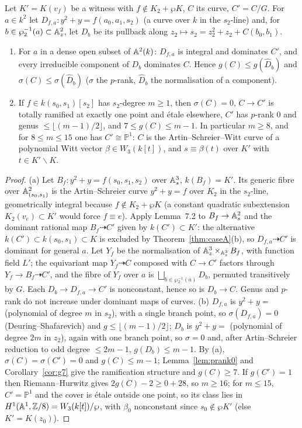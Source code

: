 \begin{theorem}\label{thm:struct}
Let $K'=K(v_f)$ be a witness with $f\notin K_2+\wp K$, $C$ its curve, $C'=C/G$. For
$a\in k^2$ let $D_{f,a}\colon y^2+y=f(a_0,a_1,s_2)$ (a curve over $k$ in the $s_2$-line)
and, for $b\in\wp_2^{-1}(a)\subset\mathbb A^2_z$, let $D_b$ be its pullback along
$z_2\mapsto s_2=z_2^2+z_2+C(b_0,b_1)$.
\begin{enumerate}
\item[(a)] For $a$ in a dense open subset of $\mathbb A^2(k)$: $D_{f,a}$ is integral and
dominates $C'$, and every irreducible component of $D_b$ dominates $C$. Hence
$g(C)\le g(\hat D_b)$ and $\sigma(C)\le\sigma(\hat D_b)$ ($\sigma$ the $p$-rank, $\hat D_b$
the normalisation of a component).
\item[(b)] If $f\in k(s_0,s_1)[s_2]$ has $s_2$-degree $m\ge1$, then $\sigma(C)=0$,
$C\to C'$ is totally ramified at exactly one point and \'etale elsewhere, $C'$ has
$p$-rank $0$ and genus $\le\lfloor(m-1)/2\rfloor$, and $7\le g(C)\le m-1$. In particular
$m\ge8$, and for $8\le m\le15$ one has $C'\cong\mathbb P^1$: $C$ is the
Artin--Schreier--Witt curve of a polynomial Witt vector $\beta\in W_3(k[t])$, and
$s\equiv\beta(t)$ over $K'$ with $t\in K'\smallsetminus K$.
\end{enumerate}
\end{theorem}

\begin{proof}
(a) Let $B_f\colon y^2+y=f(s_0,s_1,s_2)$ over $\mathbb A^3_s$, $k(B_f)=K'$. Its generic fibre
over $\mathbb A^2_{(s_0,s_1)}$ is the Artin--Schreier curve $y^2+y=f$ over $K_2$ in the
$s_2$-line, geometrically integral because $f\notin K_2+\wp K$ (a constant quadratic
subextension $K_2(v_e)\subset K'$ would force $f\equiv e$). Apply Lemma~7.2 to $B_f\to
\mathbb A^2_s$ and the dominant rational map $B_f\dashrightarrow C'$ given by $k(C')\subset K'$:
the alternative $k(C')\subset k(s_0,s_1)\subset K$ is excluded by
Theorem~\ref{thm:caseA}(b), so $D_{f,a}\dashrightarrow C'$ is dominant for general $a$.
Let $Y_f$ be the normalisation of $\mathbb A^3_z\times_{\mathbb A^3_s}B_f$, with function field $L'$;
the equivariant map $Y_f\dashrightarrow C$ composed with $C\to C'$ factors through
$Y_f\to B_f\dashrightarrow C'$, and the fibre of $Y_f$ over $a$ is
$\bigsqcup_{b\in\wp_2^{-1}(a)}D_b$, permuted transitively by $G$. Each $D_b\to D_{f,a}
\to C'$ is nonconstant, hence so is $D_b\to C$. Genus and $p$-rank do not increase under
dominant maps of curves. (b) $D_{f,a}$ is $y^2+y=$ (polynomial of degree $m$ in $s_2$),
with a single branch point, so $\sigma(D_{f,a})=0$ (Deuring--Shafarevich) and
$g\le\lfloor(m-1)/2\rfloor$; $D_b$ is $y^2+y=$ (polynomial of degree $2m$ in $z_2$),
again with one branch point, so $\sigma=0$ and, after Artin--Schreier reduction to odd
degree $\le2m-1$, $g(D_b)\le m-1$. By (a), $\sigma(C)=\sigma(C')=0$ and $g(C)\le m-1$;
Lemma~\ref{lem:prank0} and Corollary~\ref{cor:g7} give the ramification structure and
$g(C)\ge7$. If $g(C')=1$ then Riemann--Hurwitz gives $2g(C)-2\ge0+28$, so $m\ge16$; for
$m\le15$, $C'=\mathbb P^1$ and the cover is \'etale outside one point, so its class
lies in $H^1(\mathbb A^1,\mathbb Z/8)=W_3(k[t])/\wp$, with $\beta_0$ nonconstant since
$s_0\notin\wp K'$ (else $K'=K(z_0)$).
\end{proof}

